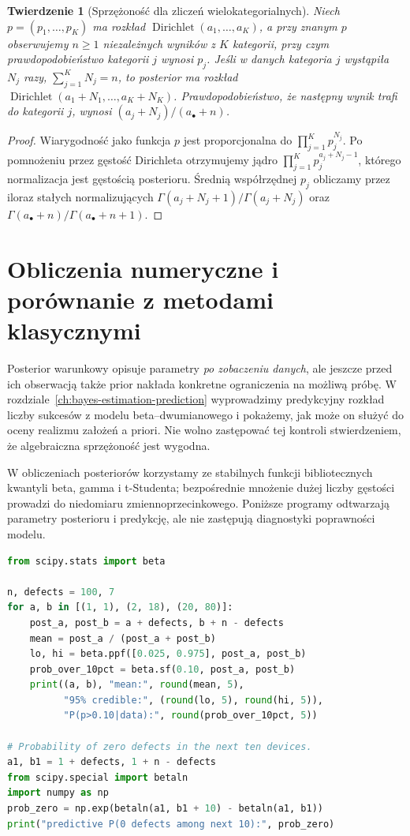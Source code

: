 \documentclass[11pt,a4paper,oneside]{report}
\numberwithin{equation}{chapter}
\theoremstyle{plain}
\newtheorem{twierdzenie}{Twierdzenie}[chapter]
\theoremstyle{definition}
\theoremstyle{remark}
\begin{document}
\begin{twierdzenie}[Sprzężoność dla zliczeń wielokategorialnych]
Niech $p=(p_1,\ldots,p_K)$ ma rozkład
$\operatorname{Dirichlet}(a_1,\ldots,a_K)$, a przy znanym $p$
obserwujemy $n\ge1$ niezależnych wyników z $K$ kategorii,
przy czym prawdopodobieństwo kategorii $j$ wynosi $p_j$.
Jeśli w danych kategoria $j$ wystąpiła $N_j$ razy,
$\sum_{j=1}^KN_j=n$, to posterior ma rozkład
$\operatorname{Dirichlet}(a_1+N_1,\ldots,a_K+N_K)$.
Prawdopodobieństwo, że następny wynik trafi do kategorii $j$,
wynosi $(a_j+N_j)/(a_\bullet+n)$.
\end{twierdzenie}
\begin{proof}
Wiarygodność jako funkcja $p$ jest proporcjonalna do
$\prod_{j=1}^Kp_j^{N_j}$. Po pomnożeniu przez gęstość
Dirichleta otrzymujemy jądro
$\prod_{j=1}^Kp_j^{a_j+N_j-1}$, którego normalizacja
jest gęstością posterioru. Średnią współrzędnej
$p_j$ obliczamy przez iloraz stałych normalizujących
$\Gamma(a_j+N_j+1)/\Gamma(a_j+N_j)$ oraz
$\Gamma(a_\bullet+n)/\Gamma(a_\bullet+n+1)$.
\end{proof}

\section{Obliczenia numeryczne i porównanie z metodami klasycznymi}
Posterior warunkowy opisuje parametry \emph{po zobaczeniu danych},
ale jeszcze przed ich obserwacją także prior nakłada konkretne
ograniczenia na możliwą próbę. W rozdziale~\ref{ch:bayes-estimation-prediction}
wyprowadzimy predykcyjny rozkład liczby sukcesów z modelu
beta--dwumianowego i pokażemy, jak może on służyć do oceny
realizmu założeń a priori. Nie wolno zastępować tej kontroli
stwierdzeniem, że algebraiczna sprzężoność jest wygodna.

W obliczeniach posteriorów korzystamy ze stabilnych funkcji
bibliotecznych kwantyli beta, gamma i t-Studenta; bezpośrednie
mnożenie dużej liczby gęstości prowadzi do niedomiaru
zmiennoprzecinkowego. Poniższe programy odtwarzają
parametry posterioru i predykcję, ale nie zastępują
diagnostyki poprawności modelu.

\begin{lstlisting}[language=Python,caption={Kompletny program: beta--dwumianowy, przedziały i test wrażliwości na prior (Python).}]
from scipy.stats import beta

n, defects = 100, 7
for a, b in [(1, 1), (2, 18), (20, 80)]:
    post_a, post_b = a + defects, b + n - defects
    mean = post_a / (post_a + post_b)
    lo, hi = beta.ppf([0.025, 0.975], post_a, post_b)
    prob_over_10pct = beta.sf(0.10, post_a, post_b)
    print((a, b), "mean:", round(mean, 5),
          "95% credible:", (round(lo, 5), round(hi, 5)),
          "P(p>0.10|data):", round(prob_over_10pct, 5))

# Probability of zero defects in the next ten devices.
a1, b1 = 1 + defects, 1 + n - defects
from scipy.special import betaln
import numpy as np
prob_zero = np.exp(betaln(a1, b1 + 10) - betaln(a1, b1))
print("predictive P(0 defects among next 10):", prob_zero)
\end{lstlisting}
\end{document}
